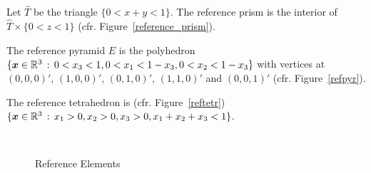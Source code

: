 \begin{defi}\label{defi_of_ref_prism}
  Let $\hat T$ be the triangle $\{ 0 < x + y < 1 \}$. 
  The reference prism is the interior of 
  $\hat T\times\{ 0 < z < 1 \}$ (cfr. Figure~\ref{reference_prism}).
\end{defi}
\begin{defi}\label{defi_of_ref_pyr}
The reference pyramid $\hat E$ is the polyhedron 
$\{\boldsymbol{x}\in\mathbb{R}^3\,:\,0< x_3< 1,
0<  x_1<  1-x_3, 0<  x_2<  1-x_3\}$
with vertices at $(0,0,0)'$,
$(1,0,0)'$, $(0,1,0)'$, $(1,1,0)'$ and $(0,0,1)'$ (cfr. Figure~\ref{refpyr}).
\end{defi}
\begin{defi}\label{def_of_ref_elems}
The reference tetrahedron is (cfr. Figure~\ref{reftetr})
$\{\boldsymbol{x}\in\mathbb{R}^3\,:\,x_1 > 0, x_2 > 0, x_3 > 0, x_1+x_2+x_3 < 1\}$.
\end{defi}

\begin{figure}
	\centering
  \hspace{1cm}
  \\
  \hspace{1cm}
	\caption{Reference Elements}
\end{figure}
